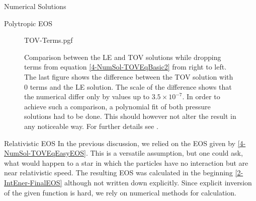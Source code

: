 \begin{section}{Numerical Solutions}
\begin{subsection}{Polytropic EOS}
\begin{figure}[ht]
	\centering
	{TOV-Terms.pgf}
	\caption[Comparison LE and partial TOV]{Comparison between the LE and TOV solutions while dropping terms from equation \ref{4-NumSol-TOVEqBasic2} from right to left. The last figure shows the difference between the TOV solution with 0 terms and the LE solution. The scale of the difference shows that the numerical differ only by values up to $3.5\times10^{-7}$. In order to achieve such a comparison, a polynomial fit of both pressure solutions had to be done. This should however not alter the result in any noticeable way. For further details see \cite{pleyerGithubRepositoryJonas}.}
	\label{4-NumSol-TovTerms}
\end{figure}

\end{subsection}
%
%
\begin{subsection}{Relativistic EOS}
In the previous discussion, we relied on the EOS given by \ref{4-NumSol-TOVEqEasyEOS}. This is a versatile assumption, but one could ask, what would happen to a star in which the particles have no interaction but are near relativistic speed. The resulting EOS was calculated in the beginning \ref{2-IntEner-FinalEOS} although not written down explicitly. Since explicit inversion of the given function is hard, we rely on numerical methods for calculation.

\end{subsection}
%
%
\end{section}
